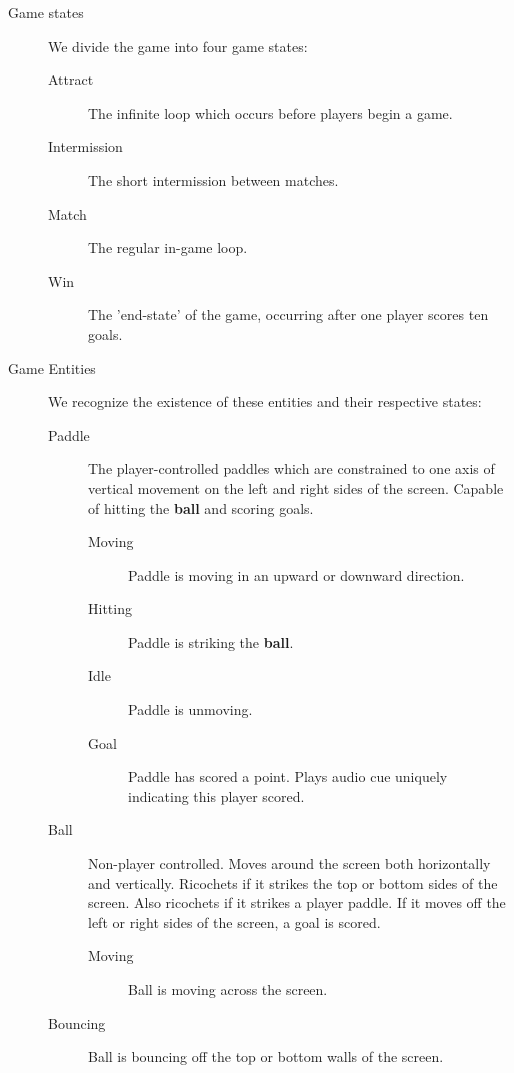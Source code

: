 \documentclass{report}
\newcommand{\ball}{\textbf{ball}\xspace}
\begin{document}
\begin{description}
    \item[Game states] We divide the game into four game states:
    \begin{description}
        \item[Attract] The infinite loop which occurs before players begin a game.
        \item[Intermission] The short intermission between matches.
        \item[Match] The regular in-game loop.
        \item[Win]   The 'end-state' of the game, occurring after one player scores ten goals.
    \end{description}
    \item[Game Entities] We recognize the existence of these entities and their respective states: 
    \begin{description}
        \item[Paddle] The player-controlled paddles which are constrained to one axis of vertical movement on the left and right sides of the screen. Capable of hitting the \ball and scoring goals.
        \begin{description}
            \item[Moving] Paddle is moving in an upward or downward direction.
            \item[Hitting] Paddle is striking the \ball.  
            \item[Idle] Paddle is unmoving.
            \item[Goal] Paddle has scored a point. Plays audio cue uniquely indicating this player scored.
        \end{description} 
        \item[Ball] Non-player controlled. Moves around the screen both horizontally and vertically. Ricochets if it strikes the top or bottom sides of the screen. Also ricochets if it strikes a player paddle. If it moves off the left or right sides of the screen, a goal is scored. 
        \begin{description}
            \item[Moving] Ball is moving across the screen.
        \end{description}
            \item[Bouncing] Ball is bouncing off the top or bottom walls of the screen. 
    \end{description}
\end{description}
\end{document}
